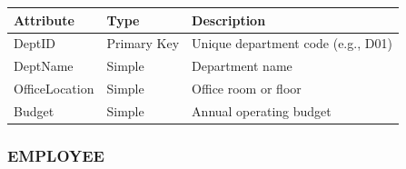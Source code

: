 \documentclass[a4paper,12pt]{report}
\newcounter{none} %
\begin{document}
{\def\LTcaptype{none} %
\begin{longtable}[]{@{}
  >{\raggedright\arraybackslash}p{}
  >{\raggedright\arraybackslash}p{}
  >{\raggedright\arraybackslash}p{}@{}}
\toprule\noalign{}
\begin{minipage}[b]{\linewidth}\raggedright
Attribute
\end{minipage} & \begin{minipage}[b]{\linewidth}\raggedright
Type
\end{minipage} & \begin{minipage}[b]{\linewidth}\raggedright
Description
\end{minipage} \\
\midrule\noalign{}
\endhead
\bottomrule\noalign{}
\endlastfoot
DeptID & Primary Key & Unique department code (\allowbreak{}e.\allowbreak{}g., D01) \\
DeptName & Simple & Department name \\
OfficeLocation & Simple & Office room or floor \\
Budget & Simple & Annual operating budget \\
\end{longtable}
}

\subsubsection{EMPLOYEE}\label{employee}
\end{document}
